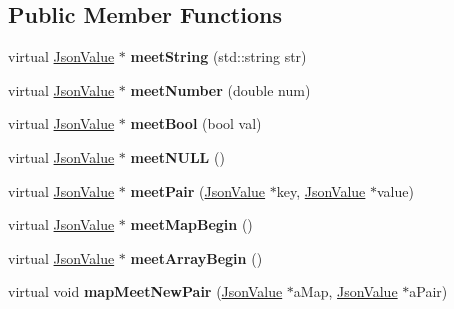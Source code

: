 \subsection*{Public Member Functions}
\begin{DoxyCompactItemize}
\item 
\hypertarget{class_concrete_builder_aa8fc4e3960780086f1447ebf366baf5f}{virtual \hyperlink{class_json_value}{Json\-Value} $\ast$ {\bfseries meet\-String} (std\-::string str)}\label{class_concrete_builder_aa8fc4e3960780086f1447ebf366baf5f}

\item 
\hypertarget{class_concrete_builder_a6391db8468b59761405efccfeb9713a9}{virtual \hyperlink{class_json_value}{Json\-Value} $\ast$ {\bfseries meet\-Number} (double num)}\label{class_concrete_builder_a6391db8468b59761405efccfeb9713a9}

\item 
\hypertarget{class_concrete_builder_a7b10acc7ce30bee8a415f713587bbc23}{virtual \hyperlink{class_json_value}{Json\-Value} $\ast$ {\bfseries meet\-Bool} (bool val)}\label{class_concrete_builder_a7b10acc7ce30bee8a415f713587bbc23}

\item 
\hypertarget{class_concrete_builder_a178b10986703cb7706508284cb7fcb9d}{virtual \hyperlink{class_json_value}{Json\-Value} $\ast$ {\bfseries meet\-N\-U\-L\-L} ()}\label{class_concrete_builder_a178b10986703cb7706508284cb7fcb9d}

\item 
\hypertarget{class_concrete_builder_a87758c86a8e56a3dcd84099fe1a94517}{virtual \hyperlink{class_json_value}{Json\-Value} $\ast$ {\bfseries meet\-Pair} (\hyperlink{class_json_value}{Json\-Value} $\ast$key, \hyperlink{class_json_value}{Json\-Value} $\ast$value)}\label{class_concrete_builder_a87758c86a8e56a3dcd84099fe1a94517}

\item 
\hypertarget{class_concrete_builder_a87ec9354604e496f8cf837970d0c1811}{virtual \hyperlink{class_json_value}{Json\-Value} $\ast$ {\bfseries meet\-Map\-Begin} ()}\label{class_concrete_builder_a87ec9354604e496f8cf837970d0c1811}

\item 
\hypertarget{class_concrete_builder_abd991e1723ecf804ff17a5737d77396f}{virtual \hyperlink{class_json_value}{Json\-Value} $\ast$ {\bfseries meet\-Array\-Begin} ()}\label{class_concrete_builder_abd991e1723ecf804ff17a5737d77396f}

\item 
\hypertarget{class_concrete_builder_aa21350f5f8138b2666294543c1d6b058}{virtual void {\bfseries map\-Meet\-New\-Pair} (\hyperlink{class_json_value}{Json\-Value} $\ast$a\-Map, \hyperlink{class_json_value}{Json\-Value} $\ast$a\-Pair)}\label{class_concrete_builder_aa21350f5f8138b2666294543c1d6b058}


\end{DoxyCompactItemize}
